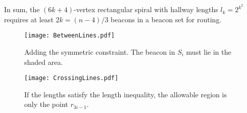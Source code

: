 \documentclass{article}
\begin{document}
In sum, the $(6k + 4)$-vertex rectangular spiral with hallway lengths $l_k =
2^{k^2}$ requires at least $2k = (n-4)/3$ beacons in a beacon set for routing.


\begin{figure}[htb] 
	\begin{center}
		\texttt{[image: BetweenLines.pdf]} 
	\end{center}
	\caption{
		Adding the symmetric constraint.  The beacon
		in $S_i$ must lie in the shaded area.
	}
	\label{fig:betweenLines}
\end{figure}  

\begin{figure}[htb] 
	\begin{center}
		\texttt{[image: CrossingLines.pdf]} 
	\end{center}
	\caption{
		If the lengths satisfy the length inequality, the allowable region is
		only the point $r_{3i-1}$.
	}\label{fig:crossingLines}
\end{figure}  
\end{document}

